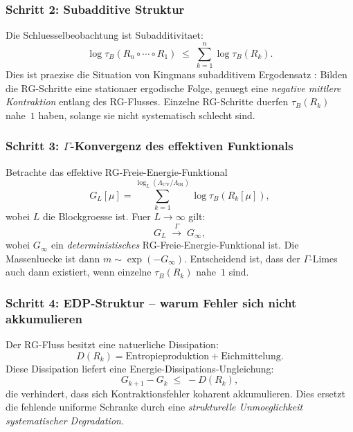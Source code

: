 \documentclass[12pt,a4paper]{article}
\theoremstyle{definition}
\theoremstyle{plain}
\theoremstyle{remark}
\begin{document}
\subsubsection*{Schritt 2: Subadditive Struktur}

Die Schluesselbeobachtung ist Subadditivitaet:
\begin{equation}\label{eq:subadditive}
  \log \tau_B(R_n \circ \cdots \circ R_1) \;\leq\; \sum_{k=1}^{n} \log \tau_B(R_k).
\end{equation}
Dies ist praezise die Situation von Kingmans subadditivem Ergodensatz \cite{Kingman1968}: Bilden die RG-Schritte eine stationaer ergodische Folge, genuegt eine \emph{negative mittlere Kontraktion} entlang des RG-Flusses. Einzelne RG-Schritte duerfen $\tau_B(R_k)$ nahe~$1$ haben, solange sie nicht systematisch schlecht sind.

\subsubsection*{Schritt 3: $\Gamma$-Konvergenz des effektiven Funktionals}

Betrachte das effektive RG-Freie-Energie-Funktional
\begin{equation}\label{eq:rg-functional}
  G_L[\mu] = \sum_{k=1}^{\log_L(\Lambda_{\mathrm{UV}}/\Lambda_{\mathrm{IR}})} \log \tau_B(R_k[\mu]),
\end{equation}
wobei $L$ die Blockgroesse ist. Fuer $L \to \infty$ gilt:
\[
  G_L \;\xrightarrow{\;\Gamma\;}\; G_\infty,
\]
wobei $G_\infty$ ein \emph{deterministisches} RG-Freie-Energie-Funktional ist. Die Massenluecke ist dann $m \sim \exp(-G_\infty)$. Entscheidend ist, dass der $\Gamma$-Limes auch dann existiert, wenn einzelne $\tau_B(R_k)$ nahe~$1$ sind.

\subsubsection*{Schritt 4: EDP-Struktur -- warum Fehler sich nicht akkumulieren}

Der RG-Fluss besitzt eine natuerliche Dissipation:
\[
  D(R_k) = \text{Entropieproduktion} + \text{Eichmittelung}.
\]
Diese Dissipation liefert eine Energie-Dissipations-Ungleichung:
\begin{equation}\label{eq:edp-rg}
  G_{k+1} - G_k \;\leq\; -D(R_k),
\end{equation}
die verhindert, dass sich Kontraktionsfehler koharent akkumulieren. Dies ersetzt die fehlende uniforme Schranke durch eine \emph{strukturelle Unmoeglichkeit systematischer Degradation}.
\end{document}
